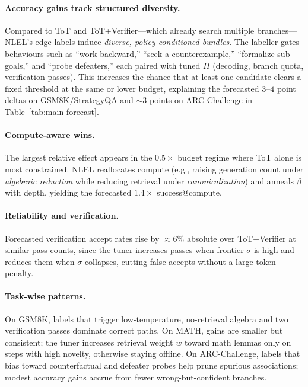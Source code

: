 \documentclass{article}
\theoremstyle{plain}
\theoremstyle{definition}
\theoremstyle{remark}
\begin{document}
\paragraph{Accuracy gains track structured diversity.}
Compared to ToT and ToT+Verifier---which already search multiple branches---NLEL's edge labels induce \emph{diverse, policy-conditioned bundles}. 
The labeller gates behaviours such as ``work backward,'' ``seek a counterexample,'' ``formalize sub-goals,'' and ``probe defeaters,'' each paired with tuned $\Pi$ (decoding, branch quota, verification passes). 
This increases the chance that at least one candidate clears a fixed threshold at the same or lower budget, explaining the forecasted $3$--$4$ point deltas on GSM8K/StrategyQA and $\sim3$ points on ARC-Challenge in Table~\ref{tab:main-forecast}.

\paragraph{Compute-aware wins.}
The largest relative effect appears in the $0.5\times$ budget regime where ToT alone is most constrained. 
NLEL reallocates compute (e.g., raising generation count under \emph{algebraic reduction} while reducing retrieval under \emph{canonicalization}) and anneals $\beta$ with depth, yielding the forecasted $1.4\times$ success@compute.

\paragraph{Reliability and verification.}
Forecasted verification accept rates rise by $\approx6\%$ absolute over ToT+Verifier at similar pass counts, since the tuner increases passes when frontier $\sigma$ is high and reduces them when $\sigma$ collapses, cutting false accepts without a large token penalty.

\paragraph{Task-wise patterns.}
On GSM8K, labels that trigger low-temperature, no-retrieval algebra and two verification passes dominate correct paths. 
On MATH, gains are smaller but consistent; the tuner increases retrieval weight $w$ toward math lemmas only on steps with high novelty, otherwise staying offline. 
On ARC-Challenge, labels that bias toward counterfactual and defeater probes help prune spurious associations; modest accuracy gains accrue from fewer wrong-but-confident branches.
\end{document}
